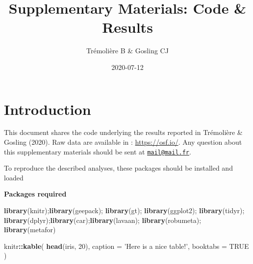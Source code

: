 \documentclass[
]{book}
\title{Supplementary Materials: Code \& Results}
\author{Trémolière B \& Gosling CJ}
\date{2020-07-12}
\newenvironment{Shaded}{\begin{snugshade}}{\end{snugshade}}
\newcommand{\DataTypeTok}[1]{\textcolor[rgb]{0.13,0.29,0.53}{#1}}
\newcommand{\DecValTok}[1]{\textcolor[rgb]{0.00,0.00,0.81}{#1}}
\newcommand{\KeywordTok}[1]{\textcolor[rgb]{0.13,0.29,0.53}{\textbf{#1}}}
\newcommand{\NormalTok}[1]{#1}
\newcommand{\OperatorTok}[1]{\textcolor[rgb]{0.81,0.36,0.00}{\textbf{#1}}}
\newcommand{\OtherTok}[1]{\textcolor[rgb]{0.56,0.35,0.01}{#1}}
\newcommand{\StringTok}[1]{\textcolor[rgb]{0.31,0.60,0.02}{#1}}
\begin{document}
\maketitle

{
\setcounter{tocdepth}{1}
\tableofcontents
}
\hypertarget{introduction}{%
\chapter*{Introduction}\label{introduction}}

This document shares the code underlying the results reported in Trémolière \& Gosling (2020).
Raw data are available in : \url{https://osf.io/}.
Any question about this supplementary materials should be sent at \href{mailto:mail@mail.fr}{\nolinkurl{mail@mail.fr}}.

To reproduce the described analyses, these packages should be installed and loaded

\textbf{Packages required}

\begin{Shaded}
\begin{Highlighting}[]
\KeywordTok{library}\NormalTok{(knitr);}\KeywordTok{library}\NormalTok{(geepack); }\KeywordTok{library}\NormalTok{(gt); }\KeywordTok{library}\NormalTok{(ggplot2); }\KeywordTok{library}\NormalTok{(tidyr); }\KeywordTok{library}\NormalTok{(dplyr);}\KeywordTok{library}\NormalTok{(car);}\KeywordTok{library}\NormalTok{(lavaan); }\KeywordTok{library}\NormalTok{(robumeta); }\KeywordTok{library}\NormalTok{(metafor)}
\end{Highlighting}
\end{Shaded}

\begin{Shaded}
\begin{Highlighting}[]
\NormalTok{knitr}\OperatorTok{::}\KeywordTok{kable}\NormalTok{(}
  \KeywordTok{head}\NormalTok{(iris, }\DecValTok{20}\NormalTok{), }\DataTypeTok{caption =} \StringTok{'Here is a nice table!'}\NormalTok{,}
  \DataTypeTok{booktabs =} \OtherTok{TRUE}
\NormalTok{)}
\end{Highlighting}
\end{Shaded}
\end{document}
